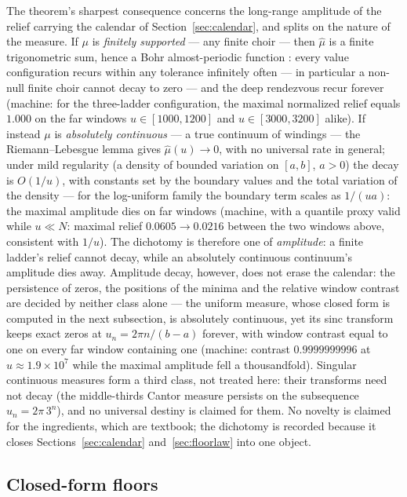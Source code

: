 \documentclass[11pt,a4paper]{article}
\begin{document}
The theorem's sharpest consequence concerns the long-range amplitude of
the relief carrying the calendar of Section~\ref{sec:calendar}, and
splits on the nature of the measure. If $\mu$ is \emph{finitely supported} --- any finite choir ---
then $\hat{\mu}$ is a finite trigonometric sum, hence a Bohr
almost-periodic function \cite{Bohr1947}: every value configuration
recurs within any tolerance infinitely often --- in particular a
non-null finite choir cannot decay to zero --- and the deep rendezvous
recur forever (machine: for the three-ladder configuration, the maximal
normalized relief equals $1.000$ on the far windows $u \in [1000,1200]$
and $u \in [3000,3200]$ alike). If instead $\mu$ is \emph{absolutely
continuous} --- a true continuum of windings --- the Riemann--Lebesgue
lemma gives $\hat{\mu}(u) \to 0$, with no universal rate in general;
under mild regularity (a density of bounded variation on $[a,b]$, $a > 0$)
the decay is $O(1/u)$, with constants set by the boundary values and the
total variation of the density --- for the log-uniform family the boundary
term scales as $1/(ua)$: the maximal amplitude dies on far windows
(machine, with a quantile proxy valid while $u \ll N$: maximal relief
$0.0605 \to 0.0216$ between the two windows above, consistent with
$1/u$). The dichotomy is therefore one of \emph{amplitude}: a finite
ladder's relief cannot decay, while an absolutely continuous continuum's
amplitude dies away. Amplitude decay, however, does not erase the
calendar: the persistence of zeros, the positions of the minima and the
relative window contrast are decided by neither class alone --- the
uniform measure, whose closed form is computed in the next subsection, is
absolutely continuous, yet its sinc transform keeps exact zeros at
$u_n = 2\pi n/(b-a)$ forever, with window contrast equal to one on every
far window containing one (machine: contrast $0.9999999996$ at
$u \approx 1.9 \times 10^{7}$ while the maximal amplitude fell a
thousandfold). Singular
continuous measures form a third class, not treated here: their transforms
need not decay (the middle-thirds Cantor measure persists on the subsequence
$u_n = 2\pi\,3^n$), and no universal destiny is claimed for them. No novelty
is claimed for
the ingredients, which are textbook; the dichotomy is recorded because
it closes Sections~\ref{sec:calendar} and~\ref{sec:floorlaw} into one
object.

\subsection{Closed-form floors}
\label{sec:closedfloors}
\end{document}
